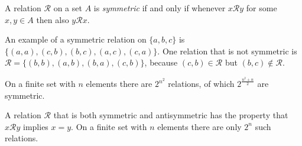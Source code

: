 \documentclass[12pt]{article}
\begin{document}

A relation $\mathcal{R}$ on a set $A$ is \emph{symmetric} if and only if
whenever $x\mathcal{R}y$ for some $x, y \in A$ then also $y\mathcal{R}x$.

An example of a symmetric relation on $\{a,b,c\}$
is $\{(a,a), (c,b), (b,c), (a,c), (c,a)\}$.
One relation that is not symmetric is
$\mathcal{R} = \{(b,b), (a,b), (b,a), (c,b) \} $,
because $(c,b) \in \mathcal{R}$ but $(b,c) \notin \mathcal{R}$.

On a finite set with $n$ elements there are $2^{n^2}$ relations,
of which $2^{\frac{n^2+n}{2}}$ are symmetric.

A relation $\mathcal{R}$ that is both symmetric and antisymmetric
has the property that $x\mathcal{R}y$ implies $x=y$.
On a finite set with $n$ elements there are only $2^n$ such relations.


\end{document}
